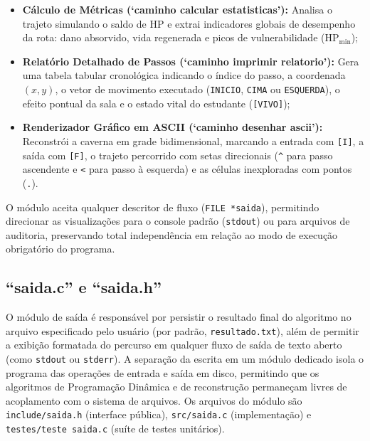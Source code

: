 \documentclass[12pt,a4paper]{article}
\makeatletter
\DeclareRobustCommand{\_}{%
  \ifmmode
    \nfss@text{\textunderscore}%
  \else
    \textunderscore\allowbreak
  \fi
}
\makeatother
\begin{document}
\begin{itemize}
    \item \textbf{Cálculo de Métricas (`caminho\_calcular\_estatisticas'):} Analisa o trajeto simulando o saldo de HP e extrai indicadores globais de desempenho da rota: dano absorvido, vida regenerada e picos de vulnerabilidade ($\text{HP}_{\min}$);
    \item \textbf{Relatório Detalhado de Passos (`caminho\_imprimir\_relatorio'):} Gera uma tabela tabular cronológica indicando o índice do passo, a coordenada $(x,y)$, o vetor de movimento executado (\texttt{INICIO}, \texttt{CIMA} ou \texttt{ESQUERDA}), o efeito pontual da sala e o estado vital do estudante (\texttt{[VIVO]});
    \item \textbf{Renderizador Gráfico em ASCII (`caminho\_desenhar\_ascii'):} Reconstrói a caverna em grade bidimensional, marcando a entrada com \texttt{[I]}, a saída com \texttt{[F]}, o trajeto percorrido com setas direcionais (\texttt{\textasciicircum} para passo ascendente e \texttt{<} para passo à esquerda) e as células inexploradas com pontos (\texttt{.}).
\end{itemize}

O módulo aceita qualquer descritor de fluxo (\texttt{FILE *saida}), permitindo direcionar as visualizações para o console padrão (\texttt{stdout}) ou para arquivos de auditoria, preservando total independência em relação ao modo de execução obrigatório do programa.


\subsection{``saida.c'' e ``saida.h''}

O módulo de saída é responsável por persistir o resultado final do algoritmo no arquivo especificado pelo usuário (por padrão, \texttt{resultado.txt}), além de permitir a exibição formatada do percurso em qualquer fluxo de saída de texto aberto (como \texttt{stdout} ou \texttt{stderr}). A separação da escrita em um módulo dedicado isola o programa das operações de entrada e saída em disco, permitindo que os algoritmos de Programação Dinâmica e de reconstrução permaneçam livres de acoplamento com o sistema de arquivos. Os arquivos do módulo são \texttt{include/saida.h} (interface pública), \texttt{src/saida.c} (implementação) e \texttt{testes/teste\_saida.c} (suíte de testes unitários).
\end{document}
